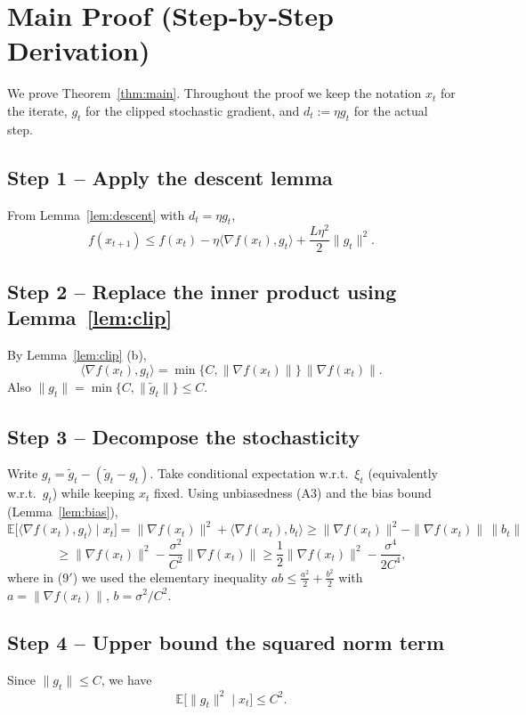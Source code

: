 \documentclass[11pt]{article}
\newcommand{\E}{\mathbb{E}}
\begin{document}
\section*{Main Proof (Step‑by‑Step Derivation)}
We prove Theorem~\ref{thm:main}.  
Throughout the proof we keep the notation $x_t$ for the iterate, $g_t$ for the clipped stochastic gradient, and $d_t:=\eta g_t$ for the actual step.

\subsection*{Step 1 – Apply the descent lemma}
From Lemma~\ref{lem:descent} with $d_t=\eta g_t$,
\[
f(x_{t+1})\le f(x_t)-\eta\langle\nabla f(x_t),g_t\rangle
+\frac{L\eta^{2}}{2}\|g_t\|^{2}.
\tag{7}
\]

\subsection*{Step 2 – Replace the inner product using Lemma~\ref{lem:clip}}
By Lemma~\ref{lem:clip} (b),
\[
\langle\nabla f(x_t),g_t\rangle
= \min\big\{C,\|\nabla f(x_t)\|\big\}\,\|\nabla f(x_t)\|.
\tag{8}
\]
Also $\|g_t\|=\min\{C,\|\tilde g_t\|\}\le C$.

\subsection*{Step 3 – Decompose the stochasticity}
Write $g_t = \tilde g_t - (\tilde g_t-g_t)$.  
Take conditional expectation w.r.t.\ $\xi_t$ (equivalently w.r.t.\ $g_t$) while keeping $x_t$ fixed.
Using unbiasedness (A3) and the bias bound (Lemma~\ref{lem:bias}),
\[
\E\big[\langle\nabla f(x_t),g_t\rangle\mid x_t\big]
= \|\nabla f(x_t)\|^{2}+ \langle\nabla f(x_t),b_t\rangle
\ge \|\nabla f(x_t)\|^{2} - \|\nabla f(x_t)\|\,\|b_t\|
\tag{9}
\]
\[
\ge \|\nabla f(x_t)\|^{2} - \frac{\sigma^{2}}{C^{2}}\|\nabla f(x_t)\|
\ge \frac{1}{2}\|\nabla f(x_t)\|^{2} - \frac{\sigma^{4}}{2C^{4}},
\tag{9$'$}
\]
where in (9$'$) we used the elementary inequality $ab\le \frac{a^{2}}{2}+\frac{b^{2}}{2}$ with
$a=\|\nabla f(x_t)\|$, $b=\sigma^{2}/C^{2}$.

\subsection*{Step 4 – Upper bound the squared norm term}
Since $\|g_t\|\le C$, we have
\[
\E\big[\|g_t\|^{2}\mid x_t\big]\le C^{2}.
\tag{10}
\]
\end{document}
